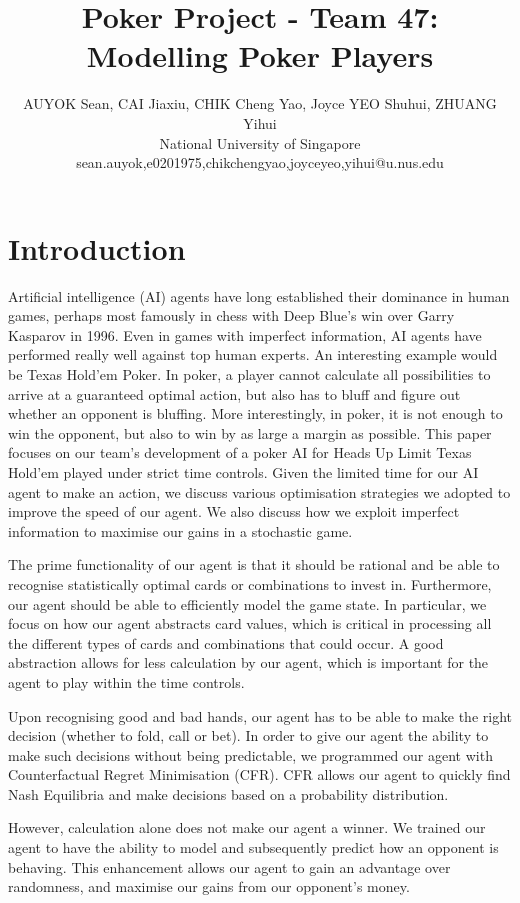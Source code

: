 \documentclass{article}
\title{Poker Project - Team 47: Modelling Poker Players}
\author{
AUYOK Sean, CAI Jiaxiu, CHIK Cheng Yao, Joyce YEO Shuhui, ZHUANG Yihui
\\ 
National University of Singapore\\
%
sean.auyok,e0201975,chikchengyao,joyceyeo,yihui@u.nus.edu
}
\begin{document}
\maketitle

\section{Introduction}

Artificial intelligence (AI) agents have long established their 
dominance in human games, perhaps most famously in chess with 
Deep Blue's win over Garry Kasparov in 1996. Even in games with 
imperfect information, AI agents have performed really well against 
top human experts. An interesting example would be Texas Hold'em 
Poker. In poker, a player cannot calculate all possibilities to 
arrive at a guaranteed optimal action, but also has to bluff and 
figure out whether an opponent is bluffing. More interestingly, in 
poker, it is not enough to win the opponent, but also to win by as 
large a margin as possible. This paper focuses on our team's 
development of a poker AI for Heads Up Limit Texas Hold'em played 
under strict time controls. Given the limited time for our AI agent 
to make an action, we discuss various optimisation strategies 
we adopted to improve the speed of our agent. We also discuss how we 
exploit imperfect information to maximise our gains in a stochastic 
game.

The prime functionality of our agent is that it should be rational 
and be able to recognise statistically optimal cards or combinations 
to invest in. Furthermore, our agent should be able to efficiently 
model the game state. In particular, we focus on how our agent 
abstracts card values, which is critical in processing all the 
different types of cards and combinations that could occur. A good 
abstraction allows for less calculation by our agent, which is 
important for the agent to play within the time controls.

Upon recognising good and bad hands, our agent has to be able to 
make the right decision (whether to fold, call or bet). In order to 
give our agent the ability to make such decisions without being 
predictable, we programmed our agent with Counterfactual Regret 
Minimisation (CFR). CFR allows our agent to quickly find Nash 
Equilibria and make decisions based on a probability distribution.

However, calculation alone does not make our agent a winner. We 
trained our agent to have the ability to model and subsequently 
predict how an opponent is behaving. This enhancement allows our 
agent to gain an advantage over randomness, and maximise our gains 
from our opponent's money.
\end{document}
